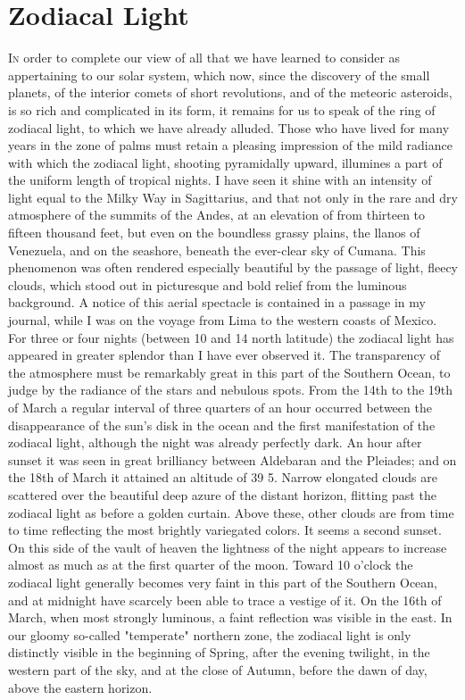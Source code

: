 
\chapter{Zodiacal Light}

\lettrine[lines = 4]{\goudy I}{n} order to complete our view of all that we have learned to consider as appertaining to our solar system, which now, since the discovery of the small planets, of the interior comets of short revolutions, and of the meteoric asteroids, is so rich and complicated in its form, it remains for us to speak of the ring of zodiacal light, to which we have already alluded. Those who have lived for many years in the zone of palms must retain a pleasing impression of the mild radiance with which the zodiacal light, shooting pyramidally upward, illumines a part of the uniform length of tropical nights. I have seen it shine with an intensity of light equal to the Milky Way in Sagittarius, and that not only in the rare and dry atmosphere of the summits of the Andes, at an elevation of from thirteen to fifteen thousand feet, but even on the boundless grassy plains, the llanos of Venezuela, and on the seashore, beneath the ever-clear sky of Cumana. This phenomenon was often rendered especially beautiful by the passage of light, fleecy clouds, which stood out in picturesque and bold relief from the luminous background. A notice of this aerial spectacle is contained in a passage in my journal, while I was on the voyage from Lima to the western coasts of Mexico. For three or four nights (between 10 and 14 north latitude) the zodiacal light has appeared in greater splendor than I have ever observed it. The transparency of the atmosphere must be remarkably great in this part of the Southern Ocean, to judge by the radiance of the stars and nebulous spots. From the 14th to the 19th of March a regular interval of three quarters of an hour occurred between the disappearance of the sun's disk in the ocean and the first manifestation of the zodiacal light, although the night was already perfectly dark. An hour after sunset it was seen in great brilliancy between Aldebaran and the Pleiades; and on the 18th of March it attained an altitude of 39 5. Narrow elongated clouds are scattered over the beautiful deep azure of the distant horizon, flitting past the zodiacal light as before a golden curtain. Above these, other clouds are from time to time reflecting the most brightly variegated colors. It seems a second sunset. On this side of the vault of heaven the lightness of the night appears to increase almost as much as at the first quarter of the moon. Toward 10 o'clock the zodiacal light generally becomes very faint in this part of the Southern Ocean, and at midnight have scarcely been able to trace a vestige of it. On the 16th of March, when most strongly luminous, a faint reflection was visible in the east. In our gloomy so-called "temperate" northern zone, the zodiacal light is only distinctly visible in the beginning of Spring, after the evening twilight, in the western part of the sky, and at the close of Autumn, before the dawn of day, above the eastern horizon.

